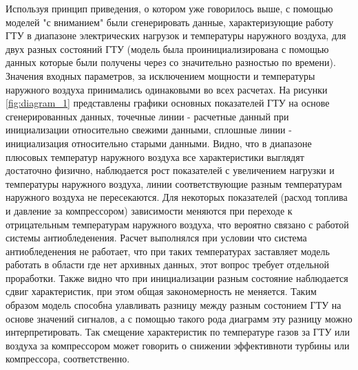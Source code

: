 \documentclass[12pt,a4paper]{article}
\begin{document}
%
%


Используя принцип приведения, о котором уже говорилось выше, с помощью моделей "с вниманием" были сгенерировать данные, характеризующие работу ГТУ в диапазоне электрических нагрузок и температуры наружного воздуха, для двух разных состояний ГТУ (модель была проинициализирована с помощью данных которые были получены через со значительно разностью по времени). Значения входных параметров, за исключением мощности и температуры наружного воздуха принимались одинаковыми во всех расчетах. На рисунки \ref{fig:diagram_1} представлены графики основных показателей ГТУ на основе сгенерированных данных, точечные линии - расчетные данный при инициализации относительно свежими данными, сплошные линии - инициализация относительно старыми данными. Видно, что в диапазоне плюсовых температур наружного воздуха все характеристики выглядят достаточно физично, наблюдается рост показателей с увеличением нагрузки и температуры наружного воздуха, линии соответствующие разным температурам наружного воздуха не пересекаются. Для некоторых показателей (расход топлива и давление за компрессором) зависимости меняются при переходе к отрицательным температурам наружного воздуха, что вероятно связано с работой системы антиобледенения. Расчет выполнялся при условии что система антиобледенения не работает, что при таких температурах заставляет модель работать в области где нет архивных данных, этот вопрос требует отдельной проработки. Также видно что при инициализации разным состояние наблюдается сдвиг характеристик, при этом общая закономерность не меняется. Таким образом модель способна улавливать разницу между разным состонием ГТУ на основе значений сигналов, а с помощью такого рода диаграмм эту разницу можно интерпретировать. Так смещение характеристик по температуре газов за ГТУ или воздуха за компрессором может говорить о снижении эффективноти турбины или компрессора, соответственно.
\end{document}
